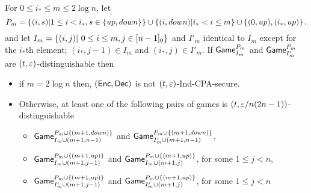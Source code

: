 \documentclass{article}
\newcommand{\game}{{\sf Game}}
\newcommand{\dgg}[2]{\game_{#1}^{#2}}
\begin{document}
\begin{lemma}\label{lem:multiple}
For $0\leq i_*\leq m \leq 2\log n$, let  $$P_m=\left\{ (i,s)| 1\leq i < i_*, s\in \left\{ up,down \right\} \right\}\cup \left\{ (i,down)| i_*< i \leq m \right\} \cup \left\{ (0,up), (i_*,up) \right\}.$$ and let $I_m=\cub{(i,j)| \ 0\leq i \leq m,  j \in[n-1]_0}$ and $I'_m$ identical to $I_m$ except for the $i_*$th element; $(i_*,j-1)\in I_m$ and $(i_*,j) \in I'_m$. If $\dgg{I_m}{P_m}$ and $\dgg{I'_m}{P_m}$ are $(t,\varepsilon)$-distinguishable then

\begin{itemize}
\item if $m=2\log n$ then, $({\sf Enc},{\sf Dec})$ is not $(t, \varepsilon)$-Ind-CPA-secure.
\item Otherwise, 
 at least one of the following pairs of games is $(t,\varepsilon/n(2n-1))$-distinguishable

\begin{itemize}
\item $\dgg{I_m\cup (m+1,n-1)}{P_m\cup \cub{(m+1, down)}}$ and $\dgg{I'_m\cup (m+1,n-1)}{P_m\cup \cub{(m+1, down)}}$,
\item $\dgg{I_m\cup (m+1,j-1)}{P_m\cup \cub{(m+1, up)}}$ and $\dgg{I_m\cup (m+1,j)}{P_m\cup \cub{(m+1, up)}}$, for some  $1\leq j< n$,
\item $\dgg{I'_m\cup (m+1,j-1)}{P_m\cup \cub{(m+1, up)}}$ and $\dgg{I'_m\cup (m+1,j)}{P_m\cup \cub{(m+1, up)}}$, for some  $1\leq j < n$
\end{itemize}
 \end{itemize}
\end{lemma}
\end{document}
